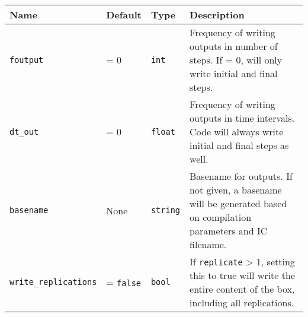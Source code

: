 \begin{tabular}[c]{p{2.5cm} p{1.5cm} p{} p{}}
Name & Default & Type & Description
\\
\hline
\hline
\texttt{foutput} &
    = 0 &
    \texttt{int} &
    Frequency of writing outputs in number of steps. If = 0, will only write
    initial and final steps.
\\ \hline
\texttt{dt\_out} &
    = 0 &
    \texttt{float} &
    Frequency of writing outputs in time intervals. Code will always write
    initial and final steps as well.
\\ \hline
\texttt{basename} &
    None &
    \texttt{string} &
    Basename for outputs. If not given, a basename will be generated based on
    compilation parameters and IC filename.
\\ \hline
\texttt{write\_replications} &
    = \texttt{false} &
    \texttt{bool} &
    If \texttt{replicate} > 1, setting this to true will write the entire content of the box, including all replications.
\end{tabular}






%
%
%















